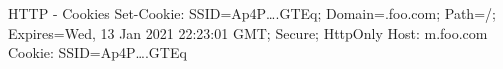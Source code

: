 \begin{frame}{HTTP - Cookies}
Set-Cookie: SSID=Ap4P….GTEq; Domain=.foo.com; Path=/; Expires=Wed, 13 Jan 2021 22:23:01 GMT; Secure; HttpOnly
\newline
\newline
Host: m.foo.com
Cookie: SSID=Ap4P….GTEq
\end{frame}
